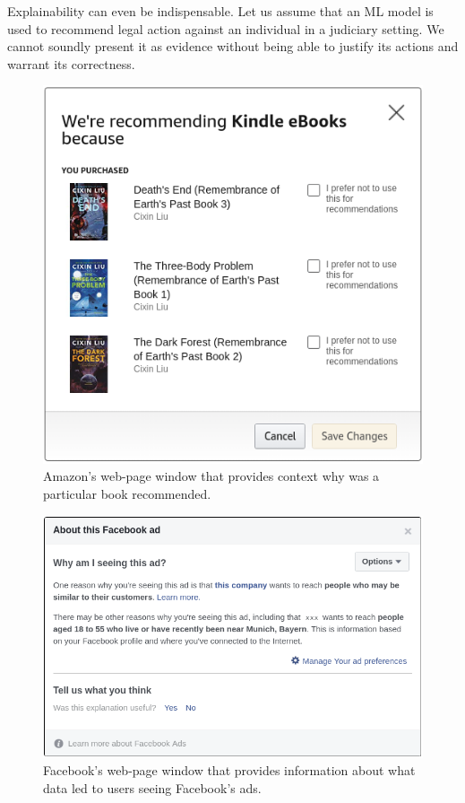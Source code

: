 Explainability can even be indispensable. Let us assume that an ML model is used to recommend legal action against an individual in a judiciary setting. We cannot soundly present it as evidence without being able to justify its actions and warrant its correctness.

\begin{figure}[htbp]
    \centering
    \includegraphics[scale=0.5]{img/AmazonExplanation.png}
    \caption{Amazon's web-page window that provides context why was a particular book recommended.}
    \label{fig:amazon_explain_book_recommendation}
\end{figure}

\begin{figure}[htbp]
    \centering
    \includegraphics[scale=0.5]{img/FacebookAdExplanation2.png}
    \caption{Facebook's web-page window that provides information about what data led to users seeing Facebook's ads.}
    \label{fig:facebook_explain_book_recommendation}
\end{figure}

